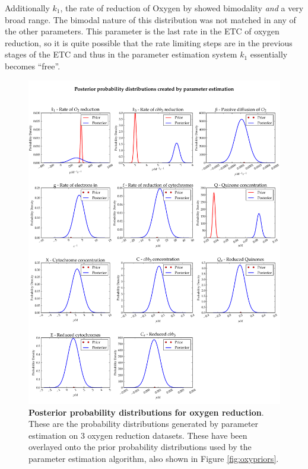 Additionally $k_1$, the rate of reduction of Oxygen by \cbbthree{} showed bimodality \textit{and} a very broad range. The bimodal nature of this distribution was not matched in any of the other parameters. This parameter is the last rate in the ETC of oxygen reduction, so it is quite possible that the rate limiting steps are in the previous stages of the ETC and thus in the parameter estimation system $k_1$ essentially becomes ``free''.

\begin{figure}[tbp]
 \centering
 \includegraphics[width=15cm]{./05-oxygenreduction/data/posteriors.pdf}
 \caption[Posterior probability distributions for oxygen reduction]{{\bf Posterior probability distributions for oxygen reduction}. These are the probability distributions generated by parameter estimation on 3 oxygen reduction datasets. These have been overlayed onto the prior probability distributions used by the parameter estimation algorithm, also shown in Figure \ref{fig:oxypriors}.
 \label{fig:oxyposteriors}}
\end{figure}

